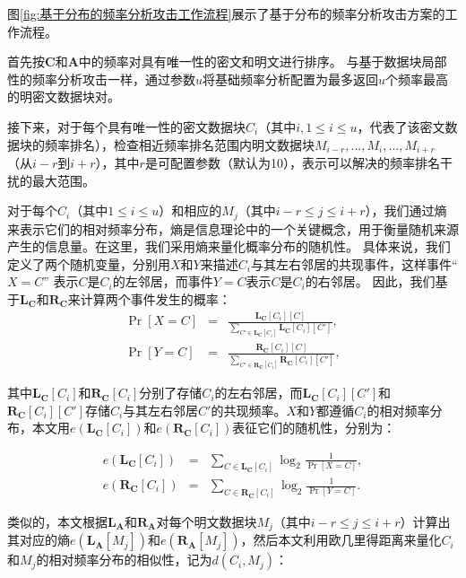 图\ref{fig:基于分布的频率分析攻击工作流程}展示了基于分布的频率分析攻击方案的工作流程。

首先按$\mathbf{C}$和$\mathbf{A}$中的频率对具有唯一性的密文和明文进行排序。 与基于数据块局部性的频率分析攻击一样，通过参数$u$将基础频率分析配置为最多返回$u$个频率最高的明密文数据块对。

接下来，对于每个具有唯一性的密文数据块$C_i$（其中$i, 1 \leq i \leq u$，代表了该密文数据块的频率排名），检查相近频率排名范围内明文数据块$M_{i-r}, \ldots, M_i, \ldots, M_{i+r}$（从$i-r$到$i+r$），其中$r$是可配置参数（默认为10），表示可以解决的频率排名干扰的最大范围。

对于每个$C_i$（其中$1 \leq i \leq u$）和相应的$M_j$（其中$i-r\le j\le i+r$），我们通过熵来表示它们的相对频率分布，熵是信息理论中的一个关键概念，用于衡量随机来源产生的信息量。在这里，我们采用熵来量化概率分布的随机性。 具体来说，我们定义了两个随机变量，分别用$X$和$Y$来描述$C_i$与其左右邻居的共现事件，这样事件“$X = C$” 表示$C$是$C_i$的左邻居，而事件$Y = C$表示$C$是$C_i$的右邻居。 因此，我们基于$\mathbf{L_C}$和$\mathbf{R_C}$来计算两个事件发生的概率：
\begin{equation}
\begin{aligned}
\label{eq:PrXYdis}
    \Pr[X = C] &=& \frac{\mathbf{L_C}[C_i][C]}{\sum_{C' \in \mathbf{L_C}[C_i]} \mathbf{L_C}[C_i][C']},  \\
    \Pr[Y = C] &=& \frac{\mathbf{R_C}[C_i][C]}{\sum_{C' \in \mathbf{R_C}[C_i]} \mathbf{R_C}[C_i][C']}, 
\end{aligned}
\end{equation}

其中$\mathbf{L_C}[C_i]$和$\mathbf{R_C}[C_i]$分别了存储$C_i$的左右邻居，而$\mathbf{L_C}[C_i][C']$和$\mathbf{R_C}[C_i][C']$存储$C_i$与其左右邻居$C'$的共现频率。$X$和$Y$都遵循$C_i$的相对频率分布，本文用$e(\mathbf{L_C}[C_i])$和$e(\mathbf{R_C}[C_i])$表征它们的随机性，分别为：

\begin{equation}
\begin{aligned}
\label{eq:e-dis}
    e(\mathbf{L_C}[C_i]) &=& \sum_{C \in \mathbf{L_C}[C_i]} \log_2\frac{1}{\Pr[X = C]}, \\
    e(\mathbf{R_C}[C_i]) &=& \sum_{C \in \mathbf{R_C}[C_i]} \log_2\frac{1}{\Pr[Y = C]}. 
\end{aligned}
\end{equation}

类似的，本文根据$\mathbf{L_A}$和$\mathbf{R_A}$对每个明文数据块$M_j$（其中$i-r\le j\le i+r$）计算出其对应的熵$e(\mathbf{L_A}[M_j])$和$e(\mathbf{R_A}[M_j])$，然后本文利用欧几里得距离来量化$C_i$和$M_j$的相对频率分布的相似性，记为$d(C_i, M_j)$：

